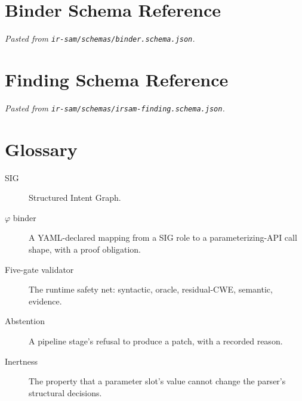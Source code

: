 \documentclass[a4paper,11pt]{report}
\begin{document}
\appendix
\chapter{Binder Schema Reference}
\textit{Pasted from \texttt{ir-sam/schemas/binder.schema.json}.}

\chapter{Finding Schema Reference}
\textit{Pasted from \texttt{ir-sam/schemas/irsam-finding.schema.json}.}

\chapter{Glossary}
\begin{description}
\item[SIG] Structured Intent Graph.
\item[$\varphi$ binder] A YAML-declared mapping from a SIG role to a parameterizing-API call shape, with a proof obligation.
\item[Five-gate validator] The runtime safety net: syntactic, oracle, residual-CWE, semantic, evidence.
\item[Abstention] A pipeline stage's refusal to produce a patch, with a recorded reason.
\item[Inertness] The property that a parameter slot's value cannot change the parser's structural decisions.
\end{description}
\end{document}
